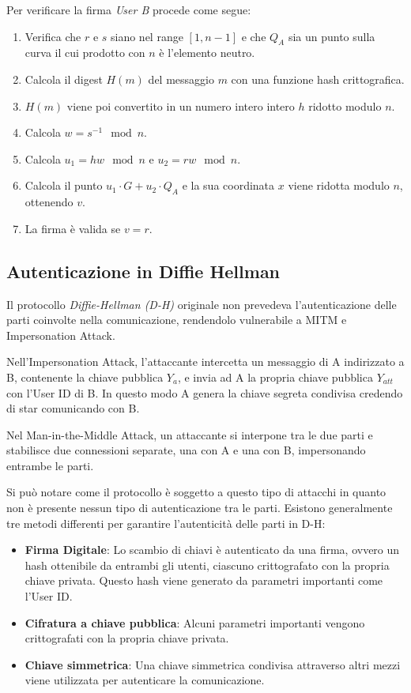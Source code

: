 \noindent Per verificare la firma \emph{User B} procede come segue:
\begin{enumerate} %
	\item Verifica che $r$ e $s$ siano nel range $[1, n-1]$ e che $Q_A$ sia un punto sulla curva il cui prodotto con $n$ è l'elemento neutro.
	\item Calcola il digest $H(m)$ del messaggio $m$ con una funzione hash crittografica.
	\item $H(m)$ viene poi convertito in un numero intero intero $h$ ridotto modulo $n$.
	\item Calcola $w = s^{-1} \mod n$.
	\item Calcola $u_1 = hw \mod n$ e $u_2 = rw \mod n$.
	\item Calcola il punto $u_1 \cdot G + u_2 \cdot Q_A$ e la sua coordinata $x$ viene ridotta modulo $n$, ottenendo $v$.
	\item La firma è valida se $v = r$.
\end{enumerate} %


\subsection{Autenticazione in Diffie Hellman}

Il protocollo \emph{Diffie-Hellman (D-H)} originale non prevedeva l'autenticazione delle parti coinvolte nella comunicazione, rendendolo vulnerabile a MITM e Impersonation Attack.

Nell'Impersonation Attack, l'attaccante intercetta un messaggio di A indirizzato a B, contenente la chiave pubblica $Y_a$, e invia ad A la propria chiave pubblica $Y_{att}$ con l'User ID di B.
In questo modo A genera la chiave segreta condivisa credendo di star comunicando con B.

Nel Man-in-the-Middle Attack, un attaccante si interpone tra le due parti e stabilisce due connessioni separate, una con A e una con B, impersonando entrambe le parti.

Si può notare come il protocollo è soggetto a questo tipo di attacchi in quanto non è presente nessun tipo di autenticazione tra le parti.
Esistono generalmente tre metodi differenti per garantire l'autenticità delle parti in D-H:
\begin{itemize}
	\item \textbf{Firma Digitale}: Lo scambio di chiavi è autenticato da una firma, ovvero un hash ottenibile da entrambi gli utenti, ciascuno crittografato con la propria chiave privata. Questo hash viene generato da parametri importanti come l'User ID.
	\item \textbf{Cifratura a chiave pubblica}: Alcuni parametri importanti vengono crittografati con la propria chiave privata.
	\item \textbf{Chiave simmetrica}: Una chiave simmetrica condivisa attraverso altri mezzi viene utilizzata per autenticare la comunicazione.
\end{itemize}

